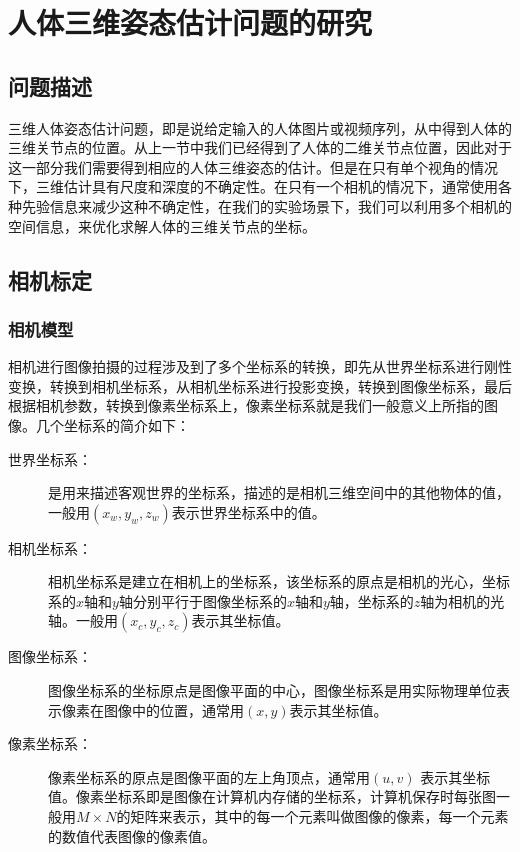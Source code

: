 

\newcommand{\qczb}{齐次坐标}
\newpage
\section{人体三维姿态估计问题的研究}
\subsection{问题描述}
三维人体姿态估计问题，即是说给定输入的人体图片或视频序列，从中得到人体的三维关节点的位置。从上一节中我们已经得到了人体的二维关节点位置，因此对于这一部分我们需要得到相应的人体三维姿态的估计。但是在只有单个视角的情况下，三维估计具有尺度和深度的不确定性。在只有一个相机的情况下，通常使用各种先验信息来减少这种不确定性，在我们的实验场景下，我们可以利用多个相机的空间信息，来优化求解人体的三维关节点的坐标。

\subsection{相机标定}
\subsubsection{相机模型}
相机进行图像拍摄的过程涉及到了多个坐标系的转换，即先从世界坐标系进行刚性变换，转换到相机坐标系，从相机坐标系进行投影变换，转换到图像坐标系，最后根据相机参数，转换到像素坐标系上，像素坐标系就是我们一般意义上所指的图像。几个坐标系的简介如下：
\begin{description}
    \item[世界坐标系：] 是用来描述客观世界的坐标系，描述的是相机三维空间中的其他物体的值，一般用\((x_w, y_w, z_w)\)表示世界坐标系中的值。
    \item[相机坐标系：] 相机坐标系是建立在相机上的坐标系，该坐标系的原点是相机的光心，坐标系的\(x\)轴和\(y\)轴分别平行于图像坐标系的\(x\)轴和\(y\)轴，坐标系的\(z\)轴为相机的光轴。一般用\((x_c,y_c,z_c)\)表示其坐标值。
    \item[图像坐标系：] 图像坐标系的坐标原点是图像平面的中心，图像坐标系是用实际物理单位表示像素在图像中的位置，通常用\((x,y)\)表示其坐标值。
    \item[像素坐标系：] 像素坐标系的原点是图像平面的左上角顶点，通常用\((u,v)\) 表示其坐标值。像素坐标系即是图像在计算机内存储的坐标系，计算机保存时每张图一般用\(M\times N\)的矩阵来表示，其中的每一个元素叫做图像的像素，每一个元素的数值代表图像的像素值。
\end{description}

